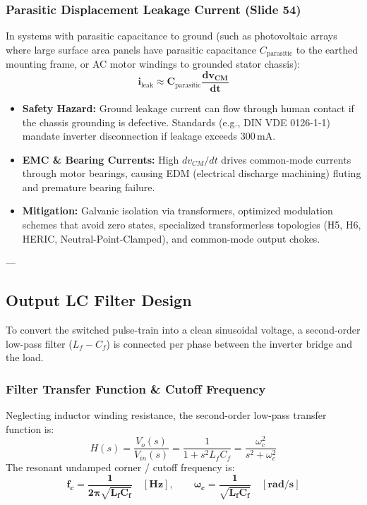 \subsubsection{Parasitic Displacement Leakage Current (Slide 54)}
In systems with parasitic capacitance to ground (such as photovoltaic arrays where large surface area panels have parasitic capacitance $C_{\mathrm{parasitic}}$ to the earthed mounting frame, or AC motor windings to grounded stator chassis):
\begin{equation}
\label{eq:ileak_formula}
\mathbf{i_{\mathrm{leak}} \approx C_{\mathrm{parasitic}} \frac{dv_{CM}}{dt}}
\end{equation}
\begin{itemize}
  \item \textbf{Safety Hazard:} Ground leakage current can flow through human contact if the chassis grounding is defective. Standards (e.g., DIN VDE 0126-1-1) mandate inverter disconnection if leakage exceeds $300\,\si{\milli\ampere}$.
  \item \textbf{EMC \& Bearing Currents:} High $dv_{CM}/dt$ drives common-mode currents through motor bearings, causing EDM (electrical discharge machining) fluting and premature bearing failure.
  \item \textbf{Mitigation:} Galvanic isolation via transformers, optimized modulation schemes that avoid zero states, specialized transformerless topologies (H5, H6, HERIC, Neutral-Point-Clamped), and common-mode output chokes.
\end{itemize}

---

\subsection{Output LC Filter Design}

To convert the switched pulse-train into a clean sinusoidal voltage, a second-order low-pass filter ($L_f - C_f$) is connected per phase between the inverter bridge and the load.

\subsubsection{Filter Transfer Function \& Cutoff Frequency}
Neglecting inductor winding resistance, the second-order low-pass transfer function is:
\begin{equation}
H(s) = \frac{V_o(s)}{V_{in}(s)} = \frac{1}{1 + s^2 L_f C_f} = \frac{\omega_c^2}{s^2 + \omega_c^2}
\end{equation}
The resonant undamped corner / cutoff frequency is:
\begin{equation}
\label{eq:fc_filter}
\mathbf{f_c = \frac{1}{2\pi \sqrt{L_f C_f}} \quad [\si{\hertz}], \qquad \omega_c = \frac{1}{\sqrt{L_f C_f}} \quad [\si{\radian\per\second}]}
\end{equation}

